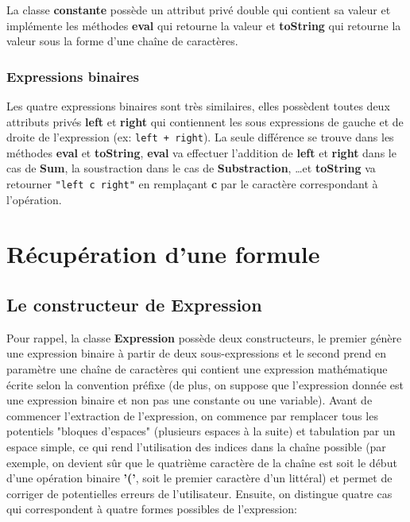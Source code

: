 \documentclass[a4paper]{article}
\begin{document}
  La classe \textbf{constante} possède un attribut privé double qui contient sa
  valeur et implémente les méthodes \textbf{eval} qui retourne la valeur et
  \textbf{toString} qui retourne la valeur sous la forme d'une chaîne de
  caractères.

  \subsubsection{Expressions binaires}%
  \label{ssub:Expressions binaires}

  Les quatre expressions binaires sont très similaires, elles possèdent toutes
  deux attributs privés \textbf{left} et \textbf{right} qui contiennent les
  sous expressions de gauche et de droite de l'expression (ex: \texttt{left +
  right}). La seule différence se trouve dans les méthodes \textbf{eval} et
  \textbf{toString}, \textbf{eval} va effectuer l'addition de \textbf{left} et
  \textbf{right} dans le cas de \textbf{Sum}, la soustraction dans le cas de
  \textbf{Substraction}, \dots et \textbf{toString} va retourner \texttt{"left
  c right"} en remplaçant \textbf{c} par le caractère correspondant à
  l'opération.
  
  \section{Récupération d'une formule}%
  \label{sec:Récupération d'une formule}
  
  \subsection{Le constructeur de Expression}%
  \label{sub:Le constructeur de Expression}
  
  Pour rappel, la classe \textbf{Expression} possède deux constructeurs, le
  premier génère une expression binaire à partir de deux sous-expressions et
  le second prend en paramètre une chaîne de caractères qui contient une
  expression mathématique écrite selon la convention préfixe (de plus, on
  suppose que l'expression donnée est une expression binaire et non pas une
  constante ou une variable). Avant de commencer l'extraction de l'expression,
  on commence par remplacer tous les potentiels "bloques d'espaces" (plusieurs
  espaces à la suite) et tabulation par un espace simple, ce qui rend
  l'utilisation des indices dans la chaîne possible (par exemple, on devient
  sûr que le quatrième caractère de la chaîne est soit le début d'une opération
  binaire \textbf{'('}, soit le premier caractère d'un littéral) et permet de
  corriger de potentielles erreurs de l'utilisateur. Ensuite, on distingue
  quatre cas qui correspondent à quatre formes possibles de
  l'expression:
\end{document}
